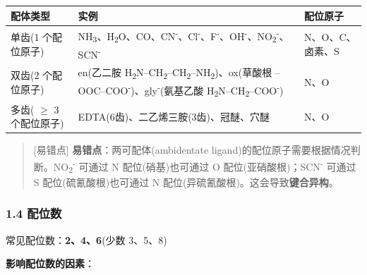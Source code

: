 {\def\LTcaptype{none} %
\begin{longtable}[]{@{}
  >{\raggedright\arraybackslash}p{}
  >{\raggedright\arraybackslash}p{}
  >{\centering\arraybackslash}p{}@{}}
\toprule\noalign{}
\begin{minipage}[b]{\linewidth}\raggedright
配体类型
\end{minipage} & \begin{minipage}[b]{\linewidth}\raggedright
实例
\end{minipage} & \begin{minipage}[b]{\linewidth}\centering
配位原子
\end{minipage} \\
\midrule\noalign{}
\endhead
\bottomrule\noalign{}
\endlastfoot
单齿(1 个配位原子) & NH\textsubscript{3}、H\textsubscript{2}O、CO、CN\textsuperscript{-}、Cl\textsuperscript{-}、F\textsuperscript{-}、OH\textsuperscript{-}、NO\textsubscript{2}\textsuperscript{-}、SCN\textsuperscript{-} & N、O、C、卤素、S \\
双齿(2 个配位原子) & en(乙二胺 H\textsubscript{2}N--CH\textsubscript{2}--CH\textsubscript{2}--NH\textsubscript{2})、ox(草酸根 --OOC--COO\textsuperscript{-})、gly\textsuperscript{-}(氨基乙酸 H\textsubscript{2}N--CH\textsubscript{2}--COO\textsuperscript{-}) & N、O \\
多齿( \(\geq\) 3 个配位原子) & EDTA(6齿)、二乙烯三胺(3齿)、冠醚、穴醚 & N、O \\
\end{longtable}
}

\begin{quote}
{[}易错点{]} \textbf{易错点}：两可配体(ambidentate ligand)的配位原子需要根据情况判断。NO\textsubscript{2}\textsuperscript{-} 可通过 N 配位(硝基)也可通过 O 配位(亚硝酸根)；SCN\textsuperscript{-} 可通过 S 配位(硫氰酸根)也可通过 N 配位(异硫氰酸根)。这会导致\textbf{键合异构}。
\end{quote}

\subsubsection{1.4 配位数}\label{ux914dux4f4dux6570}

常见配位数：\textbf{2、4、6}(少数 3、5、8)

\textbf{影响配位数的因素}：

